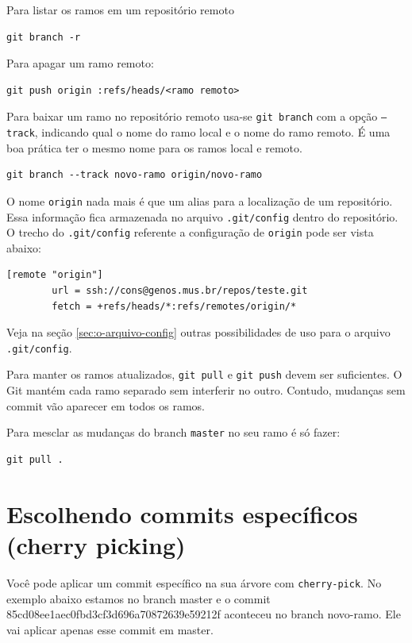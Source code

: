 \documentclass[12pt,brazil]{book}
\begin{document}
Para listar os ramos em um repositório remoto

\begin{verbatim}
git branch -r
\end{verbatim}

Para apagar um ramo remoto:

\begin{verbatim}
git push origin :refs/heads/<ramo remoto>
\end{verbatim}

Para baixar um ramo no repositório remoto usa-se \texttt{git branch}
com a opção \texttt{--track}, indicando qual o nome do ramo local e o
nome do ramo remoto. É uma boa prática ter o mesmo nome para os ramos
local e remoto.

\begin{verbatim}
git branch --track novo-ramo origin/novo-ramo
\end{verbatim}

O nome \texttt{origin} nada mais é que um alias para a localização de
um repositório. Essa informação fica armazenada no arquivo
\texttt{.git/config} dentro do repositório. O trecho do
\texttt{.git/config} referente a configuração de \texttt{origin} pode
ser vista abaixo:

\begin{verbatim}
[remote "origin"]
        url = ssh://cons@genos.mus.br/repos/teste.git
        fetch = +refs/heads/*:refs/remotes/origin/*
\end{verbatim}

Veja na seção \ref{sec:o-arquivo-config} outras possibilidades de uso
para o arquivo \texttt{.git/config}.

Para manter os ramos atualizados, \texttt{git pull} e \texttt{git
  push} devem ser suficientes. O Git mantém cada ramo separado sem
interferir no outro. Contudo, mudanças sem commit vão aparecer em
todos os ramos.

Para mesclar as mudanças do branch \texttt{master} no seu ramo é só
fazer:

\begin{verbatim}
git pull .
\end{verbatim}

\section{Escolhendo commits específicos (cherry picking)}
\label{sec:escolh-comm-espec}

Você pode aplicar um commit específico na sua árvore com
\texttt{cherry-pick}. No exemplo abaixo estamos no branch master e o
commit 85cd08ee1aec0fbd3cf3d696a70872639e59212f aconteceu no branch
novo-ramo. Ele vai aplicar apenas esse commit em master.
\end{document}

